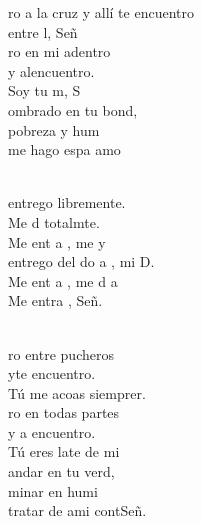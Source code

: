 \documentclass[12pt]{article}
\begin{document}
\begin{multicols*}{2}
\begin{cancion}%
	ro a la cruz y allí te encuentro  \\
	entre l, Señ\\
	ro en mi adentro  \\
	y alencuentro.  \\
	Soy tu m, S \\
	ombrado en tu bond,  \\
	 pobreza y hum \\
	me hago espa  amo  \\\jump\\
	\begin{chorus}%
	 entrego libremente.  \\
	Me d totalmte.  \\
	Me ent a , me y   \\
	 entrego del do a , mi D.  \\
	Me ent a , me d a \\
	Me entra , Señ. \\
	\end{chorus}%
	\jump\\
	ro entre pucheros \\
	yte encuentro.  \\
	Tú me acoas siemprer.  \\
	ro en todas partes  \\
	y a encuentro.  \\
	Tú eres late de mi \\
	andar en tu verd,  \\
	minar en humi\\
	tratar de ami contSeñ. \\\jump\\

\end{cancion}
\end{multicols*}
\end{document}
